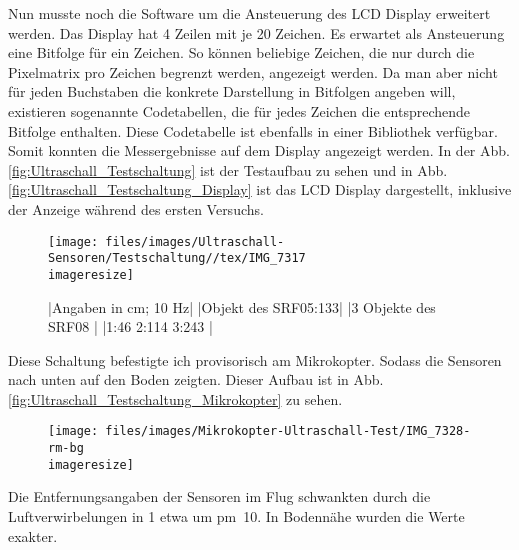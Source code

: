 Nun musste noch die Software um die Ansteuerung des \ac{LCD} Display
erweitert werden.
Das Display hat 4 Zeilen mit je 20 Zeichen.
Es erwartet als Ansteuerung eine Bitfolge für ein Zeichen.
So können beliebige Zeichen, die nur durch die Pixelmatrix pro Zeichen begrenzt werden,
angezeigt werden.
Da man aber nicht für jeden Buchstaben die konkrete Darstellung
in Bitfolgen angeben will, existieren sogenannte Codetabellen,
die für jedes Zeichen die entsprechende Bitfolge enthalten.
Diese Codetabelle ist ebenfalls in einer Bibliothek verfügbar.
Somit konnten die Messergebnisse auf dem Display angezeigt werden.
In der Abb. \vref{fig:Ultraschall_Testschaltung}
ist der Testaufbau zu sehen und in Abb. \vref{fig:Ultraschall_Testschaltung_Display}
ist das \acs{LCD} Display dargestellt, inklusive der Anzeige während des ersten Versuchs.

\begin{figure}\centering
	\texttt{[image: files/images/Ultraschall-Sensoren/Testschaltung//tex/IMG\_7317\\imageresize]}
	\label{fig:Ultraschall_Testschaltung}
\end{figure}

\begin{figure}\centering
 |Angaben in cm; 10 Hz|
			|Objekt des SRF05:133|
			|3 Objekte des SRF08 |
			|1:46   2:114  3:243 |
	\label{fig:Ultraschall_Testschaltung_Display}
\end{figure}

Diese Schaltung befestigte ich provisorisch am Mikrokopter.
Sodass die Sensoren nach unten auf den Boden zeigten.
Dieser Aufbau ist in Abb. \vref{fig:Ultraschall_Testschaltung_Mikrokopter}
zu sehen.

\begin{figure}\centering
	\texttt{[image: files/images/Mikrokopter-Ultraschall-Test/IMG\_7328-rm-bg\\imageresize]}
	\label{fig:Ultraschall_Testschaltung_Mikrokopter}
\end{figure}

Die Entfernungsangaben der Sensoren im Flug schwankten durch die Luftverwirbelungen
in \unit{1}{\metre}
etwa um \unit{\pm 10}{\centi\metre}.
In Bodennähe wurden die Werte exakter.

